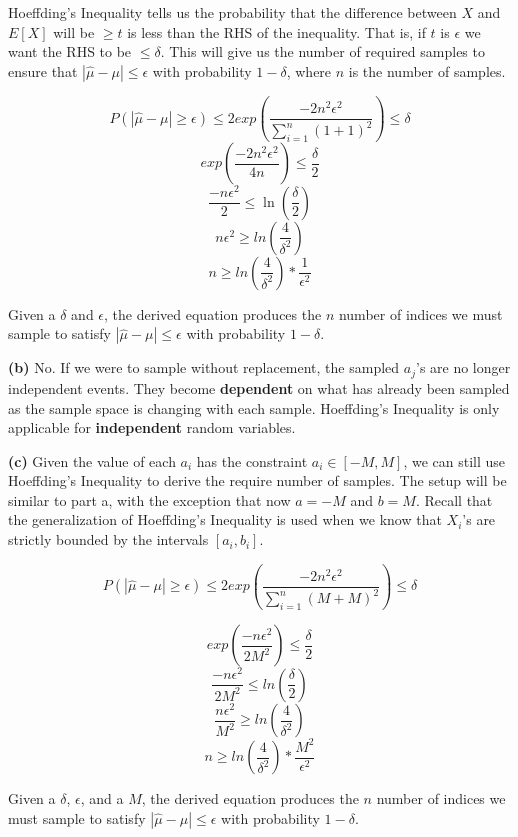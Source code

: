 \documentclass[11pt]{article}
\renewcommand\part[1]{\vspace{.10in}\textbf{(#1)}}
\begin{document}
Hoeffding's Inequality tells us the probability that the difference between $X$ and $E[X]$ will be $\geq t$ is less than the RHS of the inequality. That is, if $t$ is $\epsilon$ we want the RHS to be $\leq \delta$. This will give us the number of required samples to ensure that $|\hat \mu - \mu| \leq \epsilon$ with probability $1 - \delta$, where $n$ is the number of samples.

$$P(|\hat \mu - \mu| \geq \epsilon) \leq 2 exp(\frac{-2n^2\epsilon^2}{\sum_{i = 1}^n (1 + 1)^2}) \leq \delta$$
$$exp(\frac{-2n^2\epsilon^2}{4n}) \leq \frac{\delta}{2}$$
$$\frac{-n\epsilon^2}{2} \leq \ln(\frac{\delta}{2})$$
$$n\epsilon^2 \geq ln(\frac{4}{\delta^2})$$
$$n \geq ln(\frac{4}{\delta^2}) * \frac{1}{\epsilon^2}$$

Given a $\delta$ and $\epsilon$, the derived equation produces the $n$ number of indices we must sample to satisfy $|\hat \mu - \mu| \leq \epsilon$ with probability $1 - \delta$.

\part{b} No. If we were to sample without replacement, the sampled $a_j$'s are no longer independent events. They become \textbf{dependent} on what has already been sampled as the sample space is changing with each sample. Hoeffding's Inequality is only applicable for \textbf{independent} random variables.

\part{c} Given the value of each $a_i$ has the constraint $a_i \in [-M, M]$, we can still use Hoeffding's Inequality to derive the require number of samples. The setup will be similar to part a, with the exception that now $a = -M$ and $b = M$. Recall that the generalization of Hoeffding's Inequality is used when we know that $X_i$'s are strictly bounded by the intervals $[a_i, b_i]$.

$$P(|\hat \mu - \mu| \geq \epsilon) \leq 2 exp(\frac{-2n^2\epsilon^2}{\sum_{i = 1}^n (M + M)^2}) \leq \delta$$

$$exp(\frac{-n\epsilon^2}{2M^2}) \leq \frac{\delta}{2}$$
$$\frac{-n\epsilon^2}{2M^2} \leq ln(\frac{\delta}{2})$$
$$\frac{n\epsilon^2}{M^2} \geq ln(\frac{4}{\delta^2})$$
$$n \geq ln(\frac{4}{\delta^2}) * \frac{M^2}{\epsilon^2}$$

Given a $\delta$, $\epsilon$, and a $M$, the derived equation produces the $n$ number of indices we must sample to satisfy $|\hat \mu - \mu| \leq \epsilon$ with probability $1 - \delta$.
\end{document}
